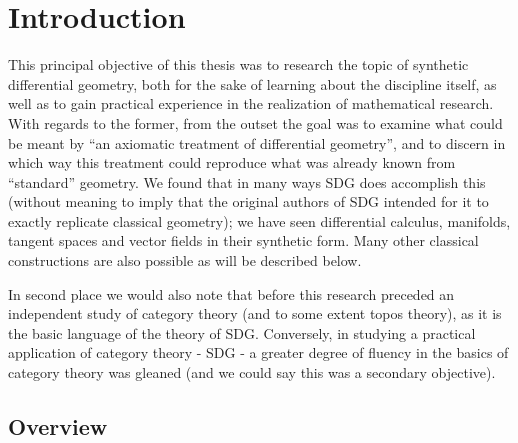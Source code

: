\chapter{Introduction}

This principal objective of this thesis was to research the topic of synthetic differential geometry, both for the sake of learning about the discipline itself, as well as to gain practical experience in the realization of mathematical research. With regards to the former, from the outset the goal was to examine what could be meant by ``an axiomatic treatment of differential geometry'', and to discern in which way this treatment could reproduce what was already known from ``standard'' geometry. We found that in many ways SDG does accomplish this (without meaning to imply that the original authors of SDG intended for it to exactly replicate classical geometry); we have seen differential calculus, manifolds, tangent spaces and vector fields in their synthetic form. Many other classical constructions are also possible as will be described below.

In second place we would also note that before this research preceded an independent study of category theory (and to some extent topos theory), as it is the basic language of the theory of SDG. Conversely, in studying a practical application of category theory - SDG - a greater degree of fluency in the basics of category theory was gleaned (and we could say this was a secondary objective).

\section{Overview}

